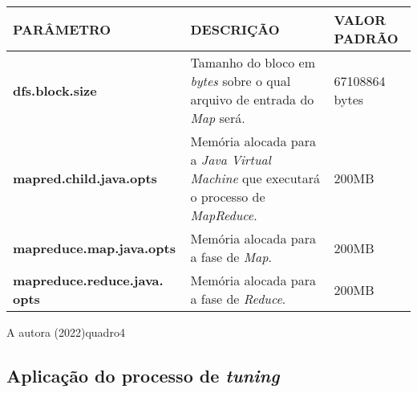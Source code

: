 {\footnotesize
  \centering
  \begin{tabular}{|p{40mm}|p{50mm}|p{30mm}|}\hline
    \textbf{PARÂMETRO}                   & \textbf{DESCRIÇÃO}                                                                                   & \textbf{VALOR PADRÃO} \\\hline
    \textbf{dfs.block.size}              & Tamanho do bloco em \textit{bytes} sobre o qual arquivo de entrada do \textit{Map} será.            & 67108864 bytes        \\\hline
    \textbf{mapred.child.java.opts}      & Memória alocada para a \textit{Java Virtual Machine} que executará o processo de \textit{MapReduce}. & 200MB                 \\\hline
    \textbf{mapreduce.map.java.opts}     & Memória alocada para a fase de \textit{Map}.                                                         & 200MB                 \\\hline
    \textbf{mapreduce.reduce.java. opts} & Memória alocada para a fase de \textit{Reduce}.                                                      & 200MB                 \\\hline
  \end{tabular}}
{A autora (2022)}{quadro4}{}{}


\newpage
\subsection{Aplicação do processo de \textit{tuning}}\label{ssec:aplicacao tuning}
